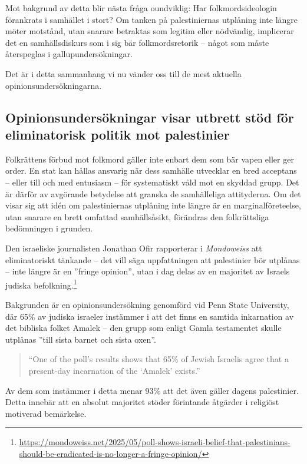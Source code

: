 Mot bakgrund av detta blir nästa fråga oundviklig: Har folkmordsideologin förankrats i samhället i stort? Om tanken på palestiniernas utplåning inte längre möter motstånd, utan snarare betraktas som legitim eller nödvändig, implicerar det en samhällsdiskurs som i sig bär folkmordsretorik – något som måste återspeglas i gallupundersökningar.


Det är i detta sammanhang vi nu vänder oss till de mest aktuella opinionsundersökningarna.


\subsection{Opinionsundersökningar visar utbrett stöd för eliminatorisk politik mot palestinier}

Folkrättens förbud mot folkmord gäller inte enbart dem som bär vapen eller ger order. En stat kan hållas ansvarig när dess samhälle utvecklar en bred acceptans – eller till och med entusiasm – för systematiskt våld mot en skyddad grupp. Det är därför av avgörande betydelse att granska de samhälleliga attityderna. Om det visar sig att idén om palestiniernas utplåning inte längre är en marginalföreteelse, utan snarare en brett omfattad samhällsåsikt, förändras den folkrättsliga bedömningen i grunden.

Den israeliske journalisten Jonathan Ofir rapporterar i \textit{Mondoweiss} att eliminatoriskt tänkande – det vill säga uppfattningen att palestinier bör utplånas – inte längre är en ”fringe opinion”, utan i dag delas av en majoritet av Israels judiska befolkning.\footnote{\url{https://mondoweiss.net/2025/05/poll-shows-israeli-belief-that-palestinians-should-be-eradicated-is-no-longer-a-fringe-opinion/}}

Bakgrunden är en opinionsundersökning genomförd vid Penn State University, där 65\% av judiska israeler instämmer i att det finns en samtida inkarnation av det bibliska folket Amalek – den grupp som enligt Gamla testamentet skulle utplånas ”till sista barnet och sista oxen”. 

\begin{quote}
“One of the poll’s results shows that 65\% of Jewish Israelis agree that a present-day incarnation of the ‘Amalek’ exists.”
\end{quote}

Av dem som instämmer i detta menar 93\% att det även gäller dagens palestinier. Detta innebär att en absolut majoritet stöder förintande åtgärder i religiöst motiverad bemärkelse.

